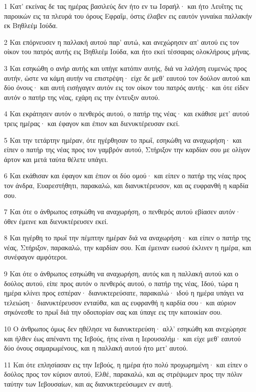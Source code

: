 \par 1 Κατ' εκείνας δε τας ημέρας βασιλεύς δεν ήτο εν τω Ισραήλ· και ήτο Λευΐτης τις παροικών εις τα πλευρά του όρους Εφραΐμ, όστις έλαβεν εις εαυτόν γυναίκα παλλακήν εκ Βηθλεέμ Ιούδα.
\par 2 Και επόρνευσεν η παλλακή αυτού παρ' αυτώ, και ανεχώρησεν απ' αυτού εις τον οίκον του πατρός αυτής εις Βηθλεέμ Ιούδα, και ήτο εκεί τέσσαρας ολοκλήρους μήνας.
\par 3 Και εσηκώθη ο ανήρ αυτής και υπήγε κατόπιν αυτής, διά να λαλήση ευμενώς προς αυτήν, ώστε να κάμη αυτήν να επιστρέψη· είχε δε μεθ' εαυτού τον δούλον αυτού και δύο όνους· και αυτή εισήγαγεν αυτόν εις τον οίκον του πατρός αυτής· και ότε είδεν αυτόν ο πατήρ της νέας, εχάρη εις την έντευξιν αυτού.
\par 4 Και εκράτησεν αυτόν ο πενθερός αυτού, ο πατήρ της νέας· και εκάθισε μετ' αυτού τρεις ημέρας· και έφαγον και έπιον και διενυκτέρευσαν εκεί.
\par 5 Και την τετάρτην ημέραν, ότε ηγέρθησαν το πρωΐ, εσηκώθη να αναχωρήση· και είπεν ο πατήρ της νέας προς τον γαμβρόν αυτού, Στήριξον την καρδίαν σου με ολίγον άρτον και μετά ταύτα θέλετε υπάγει.
\par 6 Και εκάθισαν και έφαγον και έπιον οι δύο ομού· και είπεν ο πατήρ της νέας προς τον άνδρα, Ευαρεστήθητι, παρακαλώ, και διανυκτέρευσον, και ας ευφρανθή η καρδία σου.
\par 7 Και ότε ο άνθρωπος εσηκώθη να αναχωρήση, ο πενθερός αυτού εβίασεν αυτόν· όθεν έμεινε και διενυκτέρευσεν εκεί.
\par 8 Και ηγέρθη το πρωΐ την πέμπτην ημέραν διά να αναχωρήση· και είπεν ο πατήρ της νέας, Στήριξον, παρακαλώ, την καρδίαν σου. Και έμειναν εωσού έκλινεν η ημέρα, και συνέφαγον αμφότεροι.
\par 9 Και ότε ο άνθρωπος εσηκώθη να αναχωρήση, αυτός και η παλλακή αυτού και ο δούλος αυτού, είπε προς αυτόν ο πενθερός αυτού, ο πατήρ της νέας, Ιδού, τώρα η ημέρα κλίνει προς εσπέραν· διανυκτερεύσατε, παρακαλώ· ιδού η ημέρα υπάγει να τελειώση· διανυκτέρευσον ενταύθα, και ας ευφρανθή η καρδία σου· και αύριον σηκόνεσθε το πρωΐ διά την οδοιπορίαν σας και ύπαγε εις την κατοικίαν σου.
\par 10 Ο άνθρωπος όμως δεν ηθέλησε να διανυκτερεύση· αλλ' εσηκώθη και ανεχώρησε και ήλθεν έως απέναντι της Ιεβούς, ήτις είναι η Ιερουσαλήμ· και είχε μεθ' εαυτού δύο όνους σαμαρωμένους, και η παλλακή αυτού ήτο μετ' αυτού.
\par 11 Και ότε επλησίασαν εις την Ιεβούς, η ημέρα ήτο πολύ προχωρημένη· και είπεν ο δούλος προς τον κύριον αυτού, Ελθέ, παρακαλώ, και ας στρέψωμεν προς την πόλιν ταύτην των Ιεβουσαίων, και ας διανυκτερεύσωμεν εν αυτή.
